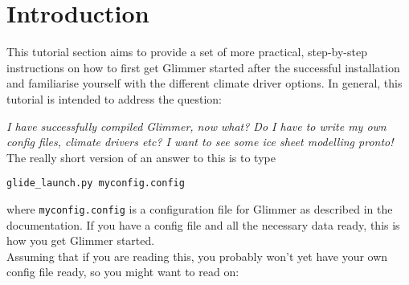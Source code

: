 \section{Introduction}
This tutorial section aims to provide a set of more practical, step-by-step
instructions on how to first get Glimmer started after the successful
installation and familiarise yourself with the different climate driver
options. In general, this tutorial is intended to address the question:

\emph{I have successfully compiled Glimmer, now what? Do I have to write my
own config files, climate drivers etc? I want to see some ice sheet modelling
pronto!}\\

The really short version of an answer to this is to type
\begin{verbatim}
glide_launch.py myconfig.config
\end{verbatim}
where \texttt{myconfig.config} is a configuration file for Glimmer as described
in the documentation. If you have a config file and all the necessary data
ready, this is how you get Glimmer started. \\
Assuming that if you are reading this, you probably won't yet have your own config
file ready, so you might want to read on:
